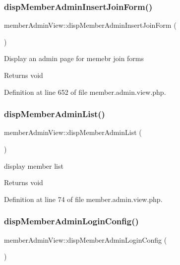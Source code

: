 \subsubsection{\texorpdfstring{disp\+Member\+Admin\+Insert\+Join\+Form()}{dispMemberAdminInsertJoinForm()}}
{\footnotesize\ttfamily member\+Admin\+View\+::disp\+Member\+Admin\+Insert\+Join\+Form (\begin{DoxyParamCaption}{ }\end{DoxyParamCaption})}

Display an admin page for memebr join forms

\begin{DoxyReturn}{Returns}
void 
\end{DoxyReturn}


Definition at line 652 of file member.\+admin.\+view.\+php.

\hypertarget{classmemberAdminView_ab234e23e8317000c0f1722ab0f54ab99}{}\label{classmemberAdminView_ab234e23e8317000c0f1722ab0f54ab99} 
\subsubsection{\texorpdfstring{disp\+Member\+Admin\+List()}{dispMemberAdminList()}}
{\footnotesize\ttfamily member\+Admin\+View\+::disp\+Member\+Admin\+List (\begin{DoxyParamCaption}{ }\end{DoxyParamCaption})}

display member list

\begin{DoxyReturn}{Returns}
void 
\end{DoxyReturn}


Definition at line 74 of file member.\+admin.\+view.\+php.

\hypertarget{classmemberAdminView_a98debda6b76587e3633453e68c58a955}{}\label{classmemberAdminView_a98debda6b76587e3633453e68c58a955} 
\subsubsection{\texorpdfstring{disp\+Member\+Admin\+Login\+Config()}{dispMemberAdminLoginConfig()}}
{\footnotesize\ttfamily member\+Admin\+View\+::disp\+Member\+Admin\+Login\+Config (\begin{DoxyParamCaption}{ }\end{DoxyParamCaption})}



